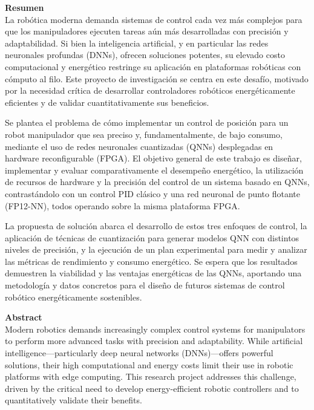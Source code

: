 \documentclass[12pt]{article}
\begin{document}
\newpage
{\large \textbf{Resumen}}\\ %

La robótica moderna demanda sistemas de control cada vez más complejos para que los manipuladores ejecuten tareas aún más desarrolladas con precisión y adaptabilidad. Si bien la inteligencia artificial, y en particular las redes neuronales profundas (DNNs), ofrecen soluciones potentes, su elevado costo computacional y energético restringe su aplicación en plataformas robóticas con cómputo al filo. Este proyecto de investigación se centra en este desafío, motivado por la necesidad crítica de desarrollar controladores robóticos energéticamente eficientes y de validar cuantitativamente sus beneficios.

Se plantea el problema de cómo implementar un control de posición para un robot manipulador que sea preciso y, fundamentalmente, de bajo consumo, mediante el uso de redes neuronales cuantizadas (QNNs) desplegadas en hardware reconfigurable (FPGA). El objetivo general de este trabajo es diseñar, implementar y evaluar comparativamente el desempeño energético, la utilización de recursos de hardware y la precisión del control de un sistema basado en QNNs, contrastándolo con un control PID clásico y una red neuronal de punto flotante (FP12-NN), todos operando sobre la misma plataforma FPGA.

La propuesta de solución abarca el desarrollo de estos tres enfoques de control, la aplicación de técnicas de cuantización para generar modelos QNN con distintos niveles de precisión, y la ejecución de un plan experimental para medir y analizar las métricas de rendimiento y consumo energético. Se espera que los resultados demuestren la viabilidad y las ventajas energéticas de las QNNs, aportando una metodología y datos concretos para el diseño de futuros sistemas de control robótico energéticamente sostenibles.

\vspace{1.5cm}
{\large \textbf{Abstract}}\\ 

Modern robotics demands increasingly complex control systems for manipulators to perform more advanced tasks with precision and adaptability. While artificial intelligence—particularly deep neural networks (DNNs)—offers powerful solutions, their high computational and energy costs limit their use in robotic platforms with edge computing. This research project addresses this challenge, driven by the critical need to develop energy-efficient robotic controllers and to quantitatively validate their benefits.
\end{document}

